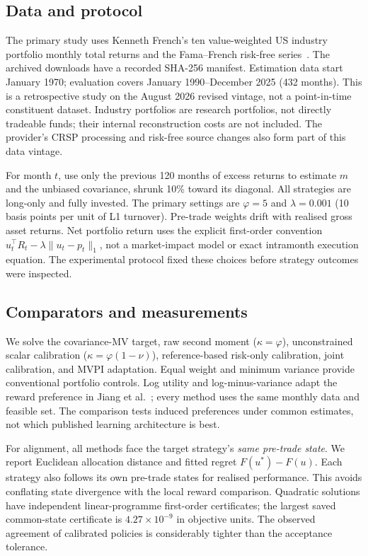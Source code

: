\documentclass[sigconf,anonymous,review]{acmart}
\begin{document}
\subsection{Data and protocol}
The primary study uses Kenneth French's ten value-weighted US industry portfolio monthly total returns and the Fama--French risk-free series\ \cite{french}. The archived downloads have a recorded SHA-256 manifest. Estimation data start January 1970; evaluation covers January 1990--December 2025 (432 months). This is a retrospective study on the August 2026 revised vintage, not a point-in-time constituent dataset. Industry portfolios are research portfolios, not directly tradeable funds; their internal reconstruction costs are not included. The provider's CRSP processing and risk-free source changes also form part of this data vintage.

For month $t$, use only the previous 120 months of excess returns to estimate $m$ and the unbiased covariance, shrunk 10\% toward its diagonal. All strategies are long-only and fully invested. The primary settings are $\varphi=5$ and $\lambda=0.001$ (10 basis points per unit of L1 turnover). Pre-trade weights drift with realised gross asset returns. Net portfolio return uses the explicit first-order convention $u_t^\top R_t-\lambda\|u_t-p_t\|_1$, not a market-impact model or exact intramonth execution equation. The experimental protocol fixed these choices before strategy outcomes were inspected.

\subsection{Comparators and measurements}
We solve the covariance-MV target, raw second moment ($\kappa=\varphi$), unconstrained scalar calibration ($\kappa=\varphi(1-\nu)$), reference-based risk-only calibration, joint calibration, and MVPI adaptation. Equal weight and minimum variance provide conventional portfolio controls. Log utility and log-minus-variance adapt the reward preference in Jiang et al.\ \cite{jiang2025}; every method uses the same monthly data and feasible set. The comparison tests induced preferences under common estimates, not which published learning architecture is best.

For alignment, all methods face the target strategy's \emph{same pre-trade state}. We report Euclidean allocation distance and fitted regret $F(u^*)-F(u)$. Each strategy also follows its own pre-trade states for realised performance. This avoids conflating state divergence with the local reward comparison. Quadratic solutions have independent linear-programme first-order certificates; the largest saved common-state certificate is $4.27\times10^{-9}$ in objective units. The observed agreement of calibrated policies is considerably tighter than the acceptance tolerance.
\end{document}
